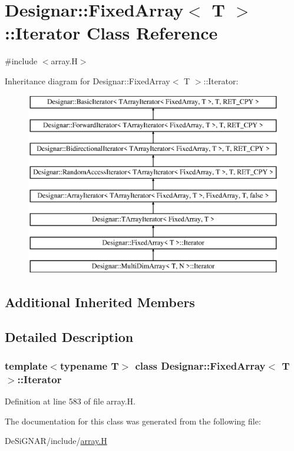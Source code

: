 \hypertarget{class_designar_1_1_fixed_array_1_1_iterator}{}\section{Designar\+:\+:Fixed\+Array$<$ T $>$\+:\+:Iterator Class Reference}
\label{class_designar_1_1_fixed_array_1_1_iterator}


{\ttfamily \#include $<$array.\+H$>$}

Inheritance diagram for Designar\+:\+:Fixed\+Array$<$ T $>$\+:\+:Iterator\+:\begin{figure}[H]
\begin{center}
\leavevmode
\includegraphics[height=8.000000cm]{class_designar_1_1_fixed_array_1_1_iterator}
\end{center}
\end{figure}
\subsection*{Additional Inherited Members}


\subsection{Detailed Description}
\subsubsection*{template$<$typename T$>$\newline
class Designar\+::\+Fixed\+Array$<$ T $>$\+::\+Iterator}



Definition at line 583 of file array.\+H.



The documentation for this class was generated from the following file\+:\begin{DoxyCompactItemize}
\item 
De\+Si\+G\+N\+A\+R/include/\hyperlink{array_8_h}{array.\+H}\end{DoxyCompactItemize}
